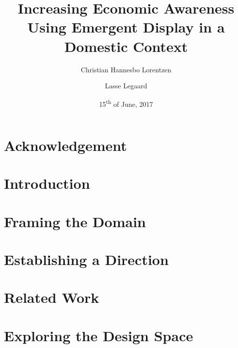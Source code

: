 \documentclass[a4paper, 12pt, twoside]{report}
\title{Increasing Economic Awareness Using Emergent Display in a Domestic Context}
\author{Christian Hannesbo Lorentzen \and Lasse Legaard}
\date{15\textsuperscript{th} of June, 2017}
\begin{document}
\begin{titlepage}
  
\end{titlepage}

\chapter*{Acknowledgement}
\thispagestyle{empty}


\begin{abstract}
  
\end{abstract}

\tableofcontents


\chapter{Introduction}
\label{ch:introduction}



\chapter{Framing the Domain}
\label{ch:framing-the-domain}



\chapter{Establishing a Direction}
\label{ch:establishing-a-direction}



\chapter{Related Work}
\label{ch:related-work}



\chapter{Exploring the Design Space}
\label{ch:exploring-the-design-space}

\end{document}
